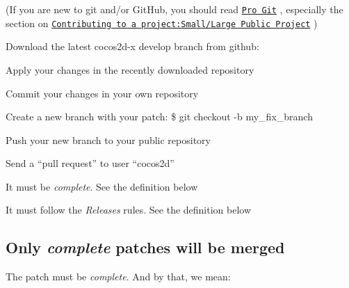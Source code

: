 (If you are new to git and/or Git\+Hub, you should read \href{http://progit.org/book/}{\tt Pro Git} , especially the section on \href{http://progit.org/book/ch5-2.html#public_small_project}{\tt Contributing to a project\+:Small/\+Large Public Project} )


\begin{DoxyItemize}
\item Download the latest cocos2d-\/x develop branch from github\+:
\end{DoxyItemize}





\begin{DoxyItemize}
\item Apply your changes in the recently downloaded repository
\item Commit your changes in your own repository
\item Create a new branch with your patch\+: {\ttfamily \$ git checkout -\/b my\+\_\+fix\+\_\+branch}
\item Push your new branch to your public repository
\item Send a “pull request” to user “cocos2d”
\item It must be {\itshape complete}. See the definition below
\item It must follow the {\itshape Releases} rules. See the definition below
\end{DoxyItemize}

\subsection*{Only {\itshape complete} patches will be merged}

The patch must be {\itshape complete}. And by that, we mean\+:


